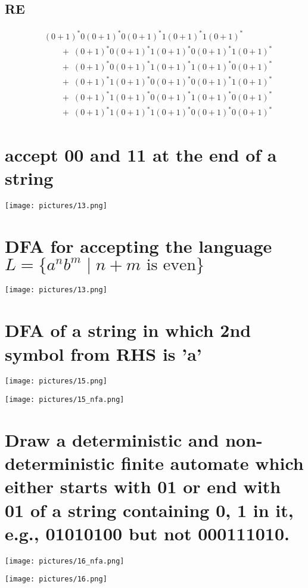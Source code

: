 \documentclass[8pt]{article}
\begin{document}
\subsection{RE}
\[
\begin{aligned}
&(0+1)^{*}0(0+1)^{*}0(0+1)^{*}1(0+1)^{*}1(0+1)^{*} \\
&\qquad+\; (0+1)^{*}0(0+1)^{*}1(0+1)^{*}0(0+1)^{*}1(0+1)^{*} \\
&\qquad+\; (0+1)^{*}0(0+1)^{*}1(0+1)^{*}1(0+1)^{*}0(0+1)^{*} \\
&\qquad+\; (0+1)^{*}1(0+1)^{*}0(0+1)^{*}0(0+1)^{*}1(0+1)^{*} \\
&\qquad+\; (0+1)^{*}1(0+1)^{*}0(0+1)^{*}1(0+1)^{*}0(0+1)^{*} \\
&\qquad+\; (0+1)^{*}1(0+1)^{*}1(0+1)^{*}0(0+1)^{*}0(0+1)^{*}
\end{aligned}
\]


\section{ accept 00 and 11 at the end of a string}
\begin{center}
    \texttt{[image: pictures/13.png]} %
\end{center}
\section{DFA for accepting the language $L = \{ a^n b^m \mid n+m \text{ is even} \}$}
\begin{center}
    \texttt{[image: pictures/13.png]} %
\end{center}
\section{DFA of a string in which 2nd symbol from RHS is 'a'}
\begin{center}
    \texttt{[image: pictures/15.png]} %
\end{center}
\begin{center}
    \texttt{[image: pictures/15\_nfa.png]} %
\end{center}
\section{Draw a deterministic and non-deterministic finite automate which either starts with 01 or end with 01 of a string containing 0, 1 in it, e.g., 01010100 but not 000111010. }
\begin{center}
    \texttt{[image: pictures/16\_nfa.png]} %
\end{center}
\begin{center}
    \texttt{[image: pictures/16.png]} %
\end{center}
\end{document}
